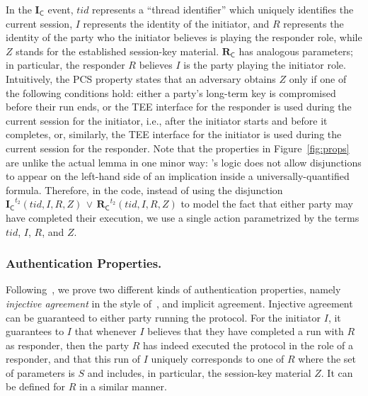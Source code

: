 \documentclass[runningheads]{llncs}
\newcommand{\mFunStyle}[1]{\textsf{#1}}
\newcommand{\mProtocolStyle}[1]{\text{#1}}
\newcommand{\mIComplete}{\ensuremath{\mathbf{I}_\mFunStyle{C}}}
\newcommand{\mRComplete}{\ensuremath{\mathbf{R}_\mFunStyle{C}}}
\newcommand{\mTamarin}{\mProtocolStyle{Tamarin}}
\newcommand{\mSessKey}{\ensuremath{Z}}
\newcommand{\mTID}{\ensuremath{\mathit{tid}}}
\begin{document}
In the \mIComplete{} event, \mTID{} represents a ``thread identifier'' which uniquely identifies the
current session, $I$ represents the identity of the initiator,
and $R$ represents the identity of the party who the initiator believes is
playing the responder role, while \mSessKey{} stands for the established
session-key material.
%
\mRComplete{} has analogous parameters; in particular, the responder $R$
believes $I$ is the party playing the initiator role.
%
Intuitively, the PCS property states that an adversary obtains \mSessKey{}
only if one of the following conditions hold: either a party's long-term key
is compromised before their run ends, or the TEE interface for the responder is used during the current
session for the initiator, i.e., after the initiator starts and before it
completes, or, similarly, the TEE interface for the initiator is used during the
current session for the responder.
%
Note that the properties in Figure~\ref{fig:props} are unlike the actual \mTamarin{} lemma in one minor way: \mTamarin's logic does not allow disjunctions to appear on
the left-hand side of an implication inside a universally-quantified formula.
%
Therefore, in the \mTamarin{} code, instead of using the disjunction
$\mIComplete^{t_2}(\mTID, I, R, \mSessKey)\, \lor\,
\mRComplete^{t_2}(\mTID, I, R, \mSessKey)$
to model the fact that either party may have completed their execution, we use
a single action parametrized by the terms $\mTID$, $I$, $R$, and \mSessKey.

\subsubsection{Authentication Properties.}
\label{sec:authenticationDef}
Following~\cite{Norr21}, we prove two different kinds of authentication
properties, namely \emph{injective agreement} in the style
of~\cite{DBLP:conf/csfw/Lowe97a}, and implicit agreement.
%
Injective agreement can be guaranteed to either party running the protocol.
%
For the initiator $I$, it guarantees to $I$ that whenever $I$ believes that
they have completed a run with $R$ as responder, then the party $R$ has 
indeed
executed the protocol in the role of a responder, and that this run of $I$
uniquely corresponds to one of $R$ where the set of parameters is $S$ and
includes, in particular, the session-key material \mSessKey{}.
%
It can be defined for $R$ in a similar manner.
\end{document}
